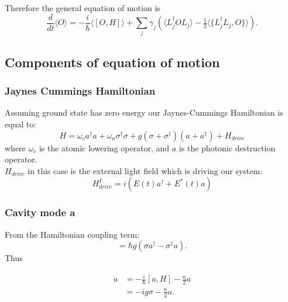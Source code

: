 \documentclass[a4paper]{article}
\begin{document}
Therefore the general equation of motion is
\begin{equation}
\frac{d}{dt}\langle O \rangle 
= -\frac{i}{\hbar}\langle [O,H] \rangle 
+ \sum_j \gamma_j \left( \langle L_j^\dagger O L_j \rangle 
- \tfrac{1}{2}\langle \{L_j^\dagger L_j, O \} \rangle \right).
\end{equation}
\newpage
\subsection{Components of equation of motion}
\subsubsection{Jaynes Cummings Hamiltonian}
Assuming ground state has zero energy our Jaynes-Cummings Hamiltonian is equal to:
\begin{equation}
    H = \omega_ca^\dagger a + \omega_a\sigma^\dagger\sigma + g(\sigma + \sigma^\dagger)(a +  a^\dagger) + H_{drive}
\end{equation}
where $\omega_c$ is the atomic lowering operator, and $a$ is the photonic destruction operator.\\
$H_{drive}$ in this case is the external light field which is driving our system:
\begin{equation}
    H_{drive}^{I} = i(E(t)a^\dagger+E^*(t)a)
\end{equation}

\subsubsection{Cavity mode a}

From the Hamiltonian coupling term:
\begin{equation}
[ a, H ] = \hbar g (\sigma a^\dagger - \sigma^\dagger a).
\end{equation}
Thus

\begin{align}
\dot{a} &= -\frac{i}{\hbar}[a,H] - \frac{\kappa}{2}a \\
&= -ig\sigma - \frac{\kappa}{2}a.
\end{align}
\end{document}
